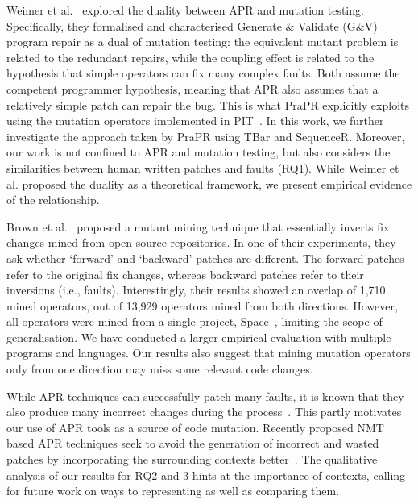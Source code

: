 \documentclass[conference]{IEEEtran}
\newcommand\inv[1]{#1\raisebox{1.15ex}{$\scriptscriptstyle-\!1$}}
\begin{document}
Weimer et al.~\cite{Weimer2013ma} explored the duality between APR and mutation
testing. Specifically, they formalised and characterised Generate \& Validate
(G\&V) program repair as a dual of mutation testing: the equivalent mutant
problem is related to the redundant repairs, while the coupling effect is
related to the hypothesis that simple operators can fix many complex faults.
Both assume the competent programmer hypothesis, meaning that APR also assumes 
that a relatively simple patch can repair the bug. This is what PraPR explicitly
exploits using the mutation operators implemented in
PIT~\cite{ghanbari2019practical}. In this work, we further investigate the
approach taken by PraPR using \inv{TBar} and \inv{SequenceR}. Moreover, our work
is not confined to APR and mutation testing, but also considers the similarities
between human written patches and faults (RQ1). While Weimer et al. proposed the
duality as a theoretical framework, we present empirical evidence of the
relationship.


Brown et al.~\cite{brown2017care} proposed a mutant mining technique that 
essentially inverts fix changes mined from open source repositories. In 
one of their experiments, they ask whether `forward' and `backward' patches are 
different. The forward patches refer to the original fix changes, whereas 
backward patches refer to their inversions (i.e., faults). Interestingly, their 
results showed an overlap of 1,710 mined operators, out of 13,929 operators mined from both directions. However, all operators were mined 
from a single project, Space~\cite{wong1997test}, limiting the scope of generalisation. We have conducted 
a larger empirical evaluation with multiple programs and languages. Our results also suggest that mining mutation operators only from 
one direction may miss some relevant code changes.

While APR techniques can successfully patch many faults, it is known that they 
also produce many incorrect changes during the process~\cite{le2011genprog}. 
This partly motivates our use of APR tools as a source of code mutation. 
Recently proposed NMT based APR techniques seek to avoid the generation of 
incorrect and wasted patches by incorporating the surrounding contexts 
better~\cite{lutellier2020coconut, jiang2021cure}. The qualitative analysis of 
our results for RQ2 and 3 hints at the importance of contexts, calling for future work on 
ways to representing as well as comparing them.


\end{document}
